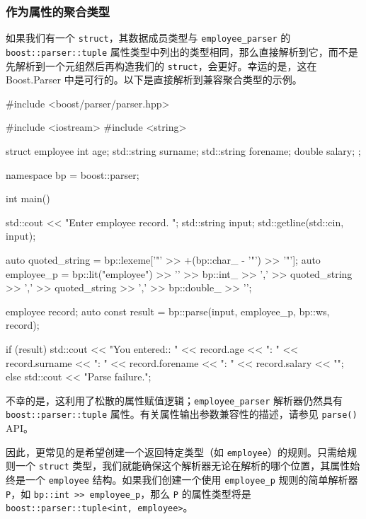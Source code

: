\subsubsection{作为属性的聚合类型}

如果我们有一个 \texttt{struct}，其数据成员类型与 \texttt{employee\_parser} 的 \texttt{boost::parser::tuple} 属性类型中列出的类型相同，那么直接解析到它，而不是先解析到一个元组然后再构造我们的 \texttt{struct}，会更好。幸运的是，这在 Boost.Parser 中是可行的。以下是直接解析到兼容聚合类型的示例。

\begin{code}
#include <boost/parser/parser.hpp>

#include <iostream>
#include <string>


struct employee
{
    int age;
    std::string surname;
    std::string forename;
    double salary;
};

namespace bp = boost::parser;

int main()
{
    std::cout << "Enter employee record. ";
    std::string input;
    std::getline(std::cin, input);

    auto quoted_string = bp::lexeme['"' >> +(bp::char_ - '"') >> '"'];
    auto employee_p = bp::lit("employee")
        >> '{'
        >> bp::int_ >> ','
        >> quoted_string >> ','
        >> quoted_string >> ','
        >> bp::double_
        >> '}';

    employee record;
    auto const result = bp::parse(input, employee_p, bp::ws, record);

    if (result) {
        std::cout << "You entered:\nage:      " << record.age
                  << "\nsurname:  " << record.surname
                  << "\nforename: " << record.forename
                  << "\nsalary  : " << record.salary << "\n";
    } else {
        std::cout << "Parse failure.\n";
    }
}
\end{code}

不幸的是，这利用了松散的属性赋值逻辑；\texttt{employee\_parser} 解析器仍然具有 \texttt{boost::parser::tuple} 属性。有关属性输出参数兼容性的描述，请参见 \texttt{parse()} API。

因此，更常见的是希望创建一个返回特定类型（如 \texttt{employee}）的规则。只需给规则一个 \texttt{struct} 类型，我们就能确保这个解析器无论在解析的哪个位置，其属性始终是一个 \texttt{employee} 结构。如果我们创建一个使用 \texttt{employee\_p} 规则的简单解析器 \texttt{P}，如 \texttt{bp::int >> employee\_p}，那么 \texttt{P} 的属性类型将是 \texttt{boost::parser::tuple<int, employee>}。

